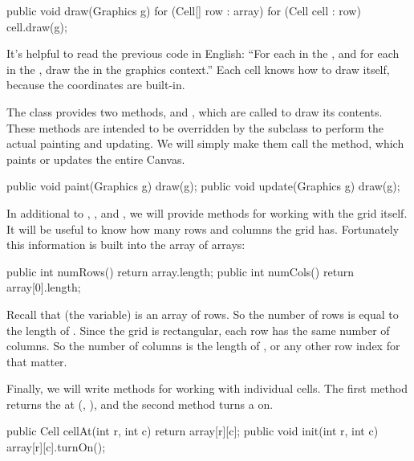 \begin{code}
public void draw(Graphics g) {
    for (Cell[] row : array) {
        for (Cell cell : row) {
            cell.draw(g);
        }
    }
}
\end{code}

It's helpful to read the previous code in English: ``For each  in the , and for each  in the , draw the  in the graphics context.''
Each cell knows how to draw itself, because the coordinates are built-in.

The  class provides two methods,  and , which are called to draw its contents.
These methods are intended to be overridden by the subclass to perform the actual painting and updating.
We will simply make them call the  method, which paints or updates the entire Canvas.


\begin{code}
public void paint(Graphics g) {
    draw(g);
}
public void update(Graphics g) {
    draw(g);
}
\end{code}

In additional to , , and , we will provide methods for working with the grid itself.
It will be useful to know how many rows and columns the grid has.
Fortunately this information is built into the array of arrays:

\begin{code}
public int numRows() {
    return array.length;
}
public int numCols() {
    return array[0].length;
}
\end{code}

Recall that  (the variable) is an array of rows.
So the number of rows is equal to the length of .
Since the grid is rectangular, each row has the same number of columns.
So the number of columns is the length of , or any other row index for that matter.

Finally, we will write methods for working with individual cells.
The first method returns the  at (, ), and the second method turns a  on.

\begin{code}
public Cell cellAt(int r, int c) {
    return array[r][c];
}
public void init(int r, int c) {
    array[r][c].turnOn();
}
\end{code}


